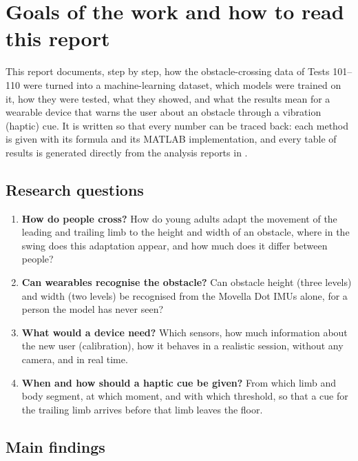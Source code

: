\section{Goals of the work and how to read this report}
\label{sec:intro}

This report documents, step by step, how the obstacle-crossing data of Tests 101--110 were turned into a machine-learning
dataset, which models were trained on it, how they were tested, what they showed, and what the results mean for a
wearable device that warns the user about an obstacle through a vibration (haptic) cue. It is written so that every number
can be traced back: each method is given with its formula and its MATLAB implementation, and every table of results is
generated directly from the analysis reports in .

\subsection{Research questions}
\label{sec:questions}

\begin{enumerate}[label=\textbf{Q\arabic*}]
  \item \textbf{How do people cross?} How do young adults adapt the movement of the leading and trailing limb to the height
  and width of an obstacle, where in the swing does this adaptation appear, and how much does it differ between people?
  \item \textbf{Can wearables recognise the obstacle?} Can obstacle height (three levels) and width (two levels) be
  recognised from the Movella Dot IMUs alone, for a person the model has never seen?
  \item \textbf{What would a device need?} Which sensors, how much information about the new user (calibration), how it
  behaves in a realistic session, without any camera, and in real time.
  \item \textbf{When and how should a haptic cue be given?} From which limb and body segment, at which moment, and with
  which threshold, so that a cue for the trailing limb arrives before that limb leaves the floor.
\end{enumerate}

\subsection{Main findings}

